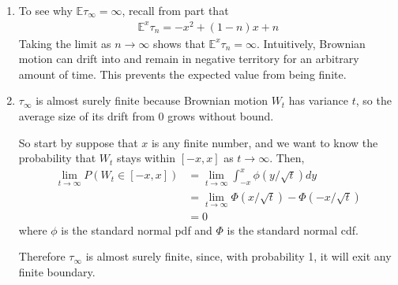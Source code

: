 \documentclass[12pt]{article}
\theoremstyle{plain}
\theoremstyle{definition}
\theoremstyle{remark}
\begin{document}
\begin{enumerate}
\begin{enumerate}
      \item %
        To see why $\mathbb{E}\tau_\infty =\infty$, recall from part
        that
        \begin{align*}
          \mathbb{E}^x\tau_n = -x^2 + (1-n)x+n
        \end{align*}
        Taking the limit as $n\rightarrow\infty$ shows that
        $\mathbb{E}^x\tau_n=\infty$. Intuitively, Brownian motion can
        drift into and remain in negative territory for an arbitrary
        amount of time. This prevents the expected value from being
        finite.

      \item %
        $\tau_\infty$ is almost surely finite because Brownian motion
        $W_t$ has variance $t$, so the average size of its drift from 0
        grows without bound.

        So start by suppose that $x$ is any finite number, and we want
        to know the probability that $W_t$ stays within $[-x,x]$ as
        $t\rightarrow\infty$. Then,
        \begin{align*}
          \lim_{t\rightarrow\infty}
          P(W_t\in[-x,x])
          &=
          \lim_{t\rightarrow\infty}
          \int^x_{-x} \phi\left(y/\sqrt{t}\right) dy\\
          &=
          \lim_{t\rightarrow\infty}
          \Phi\left(x/\sqrt{t}\right) -\Phi\left(-x/\sqrt{t}\right)\\
          &=0
        \end{align*}
        where $\phi$ is the standard normal pdf and $\Phi$ is the standard normal cdf.

        Therefore $\tau_\infty$ is almost surely finite, since, with
        probability 1, it will exit any finite boundary.


\end{enumerate}
\end{enumerate}
\end{document}
